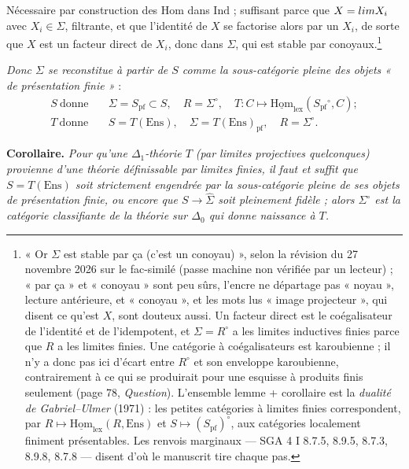 \documentclass[11pt,a4paper]{article}
\begin{document}
Nécessaire par construction des Hom dans $\mathrm{Ind}$ ; suffisant parce
que $X = \varinjlim X_{i}$ avec $X_{i} \in \Sigma$, filtrante, et que
l'identité de $X$ se factorise alors par un $X_{i}$, de sorte que $X$ est
un facteur direct de $X_{i}$, donc dans $\Sigma$, qui est stable par
conoyaux.\footnote{« Or $\Sigma$ est stable par ça (c'est un conoyau) »,
selon la révision du 27 novembre 2026 sur le fac-similé (passe machine non
vérifiée par un lecteur) ; « par ça » et « conoyau » sont peu sûrs, l'encre ne
départage pas « noyau », lecture antérieure, et « conoyau », et les mots lus
« image projecteur », qui disent ce qu'est $X$, sont douteux aussi. Un
facteur direct est le coégalisateur de l'identité et de l'idempotent, et $\Sigma = R^{\circ}$
a les limites inductives finies parce que $R$ a les limites finies. Une
catégorie à coégalisateurs est karoubienne ; il n'y a donc pas ici
d'écart entre $R^{\circ}$ et son enveloppe karoubienne, contrairement à ce
qui se produirait pour une esquisse à produits finis seulement (page 78,
\emph{Question}). L'ensemble lemme + corollaire est la \emph{dualité de
Gabriel--Ulmer} (1971) : les petites catégories à limites finies
correspondent, par $R \mapsto \underline{\mathrm{Hom}}_{\mathrm{lex}}(R,
\mathrm{Ens})$ et $S \mapsto (S_{\mathrm{pf}})^{\circ}$, aux catégories
localement finiment présentables. Les renvois marginaux — SGA 4 I 8.7.5,
8.9.5, 8.7.3, 8.9.8, 8.7.8 — disent d'où le manuscrit tire chaque pas.}

\emph{Donc $\Sigma$ se reconstitue à partir de $S$ comme la sous-catégorie
pleine des objets « de présentation finie »} :
\begin{align*}
S \ \text{donne}\quad & \Sigma = S_{\mathrm{pf}} \subset S, \quad R = \Sigma^{\circ},
\quad T : C \mapsto \underline{\mathrm{Hom}}_{\mathrm{lex}}(S_{\mathrm{pf}}{}^{\circ}, C) ; \\
T \ \text{donne}\quad & S = T(\mathrm{Ens}), \quad \Sigma = T(\mathrm{Ens})_{\mathrm{pf}},
\quad R = \Sigma^{\circ}.
\end{align*}

\textbf{Corollaire.} \emph{Pour qu'une $\Delta_{1}$-théorie $T$ (par
limites projectives quelconques) provienne d'une théorie définissable par
limites finies, il faut et suffit que $S = T(\mathrm{Ens})$ soit strictement
engendrée par la sous-catégorie pleine de ses objets de présentation
finie, ou encore que $S \to \widehat{\Sigma}$ soit pleinement fidèle ; alors
$\Sigma^{\circ}$ est la catégorie classifiante de la théorie sur $\Delta_{0}$
qui donne naissance à $T$.}
\end{document}
